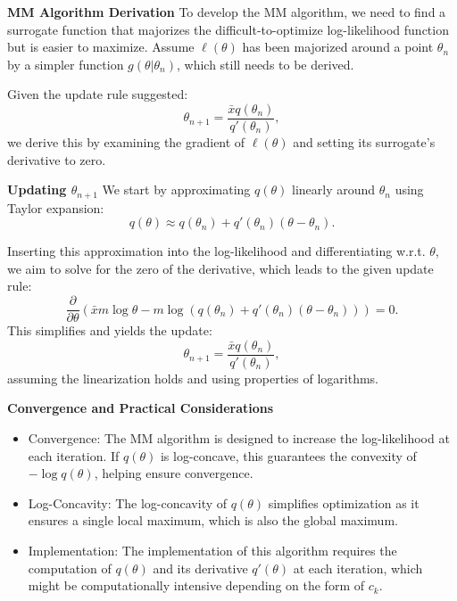 \documentclass[8pt]{article}
\begin{document}
{\textbf{MM Algorithm Derivation}
To develop the MM algorithm, we need to find a surrogate function that majorizes the difficult-to-optimize log-likelihood function but is easier to maximize. Assume \(\ell(\theta)\) has been majorized around a point \(\theta_n\) by a simpler function \(g(\theta | \theta_n)\), which still needs to be derived.

Given the update rule suggested:
\[
\theta_{n+1} = \frac{\bar{x} q(\theta_n)}{q'(\theta_n)},
\]
we derive this by examining the gradient of \(\ell(\theta)\) and setting its surrogate's derivative to zero.

\textbf{Updating \(\theta_{n+1}\)}
We start by approximating \(q(\theta)\) linearly around \(\theta_n\) using Taylor expansion:
\[
q(\theta) \approx q(\theta_n) + q'(\theta_n)(\theta - \theta_n).
\]

Inserting this approximation into the log-likelihood and differentiating w.r.t. \(\theta\), we aim to solve for the zero of the derivative, which leads to the given update rule:
\[
\frac{\partial}{\partial \theta} \left(\bar{x} m \log \theta - m \log (q(\theta_n) + q'(\theta_n)(\theta - \theta_n))\right) = 0.
\]
This simplifies and yields the update:
\[
\theta_{n+1} = \frac{\bar{x} q(\theta_n)}{q'(\theta_n)},
\]
assuming the linearization holds and using properties of logarithms.

\textbf{Convergence and Practical Considerations}
\begin{itemize}
    \item Convergence: The MM algorithm is designed to increase the log-likelihood at each iteration. If \(q(\theta)\) is log-concave, this guarantees the convexity of \(-\log q(\theta)\), helping ensure convergence.
    \item Log-Concavity: The log-concavity of \(q(\theta)\) simplifies optimization as it ensures a single local maximum, which is also the global maximum.
    \item Implementation: The implementation of this algorithm requires the computation of \(q(\theta)\) and its derivative \(q'(\theta)\) at each iteration, which might be computationally intensive depending on the form of \(c_k\).
\end{itemize}


}
\end{document}
